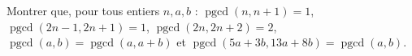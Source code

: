 Montrer que, pour tous entiers $n, a, b$ : $\operatorname{pgcd}(n, n + 1) = 1$, $\operatorname{pgcd}(2n - 1, 2n + 1) = 1$, $\operatorname{pgcd}(2n, 2n + 2) = 2$, $\operatorname{pgcd}(a, b) = \operatorname{pgcd}(a, a + b)$ et $\operatorname{pgcd}(5a + 3b, 13a + 8b) = \operatorname{pgcd}(a, b)$.
